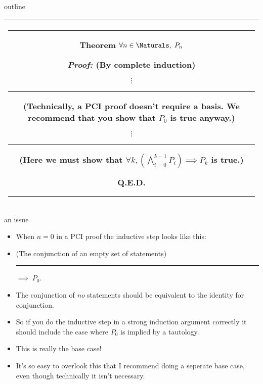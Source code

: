 \documentclass[handout,landscape]{beamer}
\begin{document}
\begin{frame}{outline}
\begin{center}
\begin{tabular}{|c|} \hline
\rule{16pt}{0pt}\begin{minipage}{.75\textwidth}

\rule{0pt}{16pt}{\bf \large Theorem} $ \displaystyle \forall n \in \Naturals, \; P_n $
\medskip

\rule{0pt}{20pt} {\em Proof:} (By complete induction)

\noindent {\bf Basis:}

\begin{center}
$\vdots$ \rule{36pt}{0pt} \begin{minipage}[c]{2.3 in} (Technically, a PCI %
proof doesn't require a basis.   We recommend that you show that $P_0$ %
is true anyway.) \end{minipage}
\end{center}

\noindent {\bf Inductive step:}

\begin{center}
$\vdots$ \rule{36pt}{0pt} \begin{minipage}[c]{2.3 in} (Here we must show that $\forall k,  \left( \bigwedge_{i=0}^{k-1} P_i \right) \implies P_{k}$ is true.) \end{minipage}
\end{center}

\rule{0pt}{0pt} \hspace{\fill} Q.E.D. \rule[-10pt]{0pt}{16pt}
\end{minipage} \rule{16pt}{0pt} \\ \hline
\end{tabular}
\end{center}
\end{frame}

\begin{frame}{an issue}
\begin{itemize}
\item When $n=0$ in a PCI proof the inductive step looks like this: \pause
\item (The conjunction of an empty set of statements) \rule{1pt}{0pt} $\implies \; P_0$. \pause
\item The conjunction of {\em no} statements should be equivalent to the identity for conjunction. \pause
\item So if you do the inductive step in a strong induction argument correctly it should include the case where $P_0$ is implied by a tautology.\pause
\item This is really the base case! \pause
\item It's so easy to overlook this that I recommend doing a seperate base case, even though technically it isn't necessary.
\end{itemize}
\end{frame}
\end{document}
